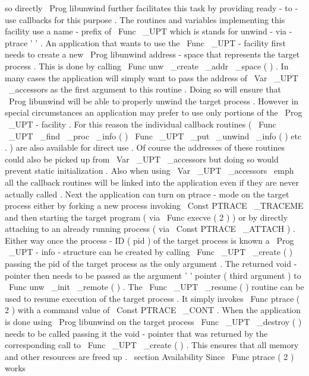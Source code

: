 so
directly
\
Prog
{
libunwind
}
further
facilitates
this
task
by
providing
ready
-
to
-
use
callbacks
for
this
purpose
.
The
routines
and
variables
implementing
this
facility
use
a
name
-
prefix
of
\
Func
{
\
_UPT
}
which
is
stands
for
unwind
-
via
-
ptrace
'
'
.
An
application
that
wants
to
use
the
\
Func
{
\
_UPT
}
-
facility
first
needs
to
create
a
new
\
Prog
{
libunwind
}
address
-
space
that
represents
the
target
process
.
This
is
done
by
calling
\
Func
{
unw
\
_create
\
_addr
\
_space
}
(
)
.
In
many
cases
the
application
will
simply
want
to
pass
the
address
of
\
Var
{
\
_UPT
\
_accessors
}
as
the
first
argument
to
this
routine
.
Doing
so
will
ensure
that
\
Prog
{
libunwind
}
will
be
able
to
properly
unwind
the
target
process
.
However
in
special
circumstances
an
application
may
prefer
to
use
only
portions
of
the
\
Prog
{
\
_UPT
}
-
facility
.
For
this
reason
the
individual
callback
routines
(
\
Func
{
\
_UPT
\
_find
\
_proc
\
_info
}
(
)
\
Func
{
\
_UPT
\
_put
\
_unwind
\
_info
}
(
)
etc
.
)
are
also
available
for
direct
use
.
Of
course
the
addresses
of
these
routines
could
also
be
picked
up
from
\
Var
{
\
_UPT
\
_accessors
}
but
doing
so
would
prevent
static
initialization
.
Also
when
using
\
Var
{
\
_UPT
\
_accessors
}
\
emph
{
all
}
the
callback
routines
will
be
linked
into
the
application
even
if
they
are
never
actually
called
.
Next
the
application
can
turn
on
ptrace
-
mode
on
the
target
process
either
by
forking
a
new
process
invoking
\
Const
{
PTRACE
\
_TRACEME
}
and
then
starting
the
target
program
(
via
\
Func
{
execve
}
(
2
)
)
or
by
directly
attaching
to
an
already
running
process
(
via
\
Const
{
PTRACE
\
_ATTACH
}
)
.
Either
way
once
the
process
-
ID
(
pid
)
of
the
target
process
is
known
a
\
Prog
{
\
_UPT
}
-
info
-
structure
can
be
created
by
calling
\
Func
{
\
_UPT
\
_create
}
(
)
passing
the
pid
of
the
target
process
as
the
only
argument
.
The
returned
void
-
pointer
then
needs
to
be
passed
as
the
argument
'
'
pointer
(
third
argument
)
to
\
Func
{
unw
\
_init
\
_remote
}
(
)
.
The
\
Func
{
\
_UPT
\
_resume
}
(
)
routine
can
be
used
to
resume
execution
of
the
target
process
.
It
simply
invokes
\
Func
{
ptrace
}
(
2
)
with
a
command
value
of
\
Const
{
PTRACE
\
_CONT
}
.
When
the
application
is
done
using
\
Prog
{
libunwind
}
on
the
target
process
\
Func
{
\
_UPT
\
_destroy
}
(
)
needs
to
be
called
passing
it
the
void
-
pointer
that
was
returned
by
the
corresponding
call
to
\
Func
{
\
_UPT
\
_create
}
(
)
.
This
ensures
that
all
memory
and
other
resources
are
freed
up
.
\
section
{
Availability
}
Since
\
Func
{
ptrace
}
(
2
)
works
